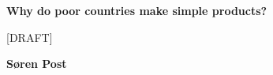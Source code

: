 \begin{titlepage}
   \begin{center}
       \vspace*{1cm}

       \textbf{Why do poor countries make simple products?}

       \vspace{0.5cm}
        [DRAFT]

       \vspace{1.5cm}

       \textbf{Søren Post}

       \vfill


       \vspace{0.8cm}



   \end{center}
\end{titlepage}

